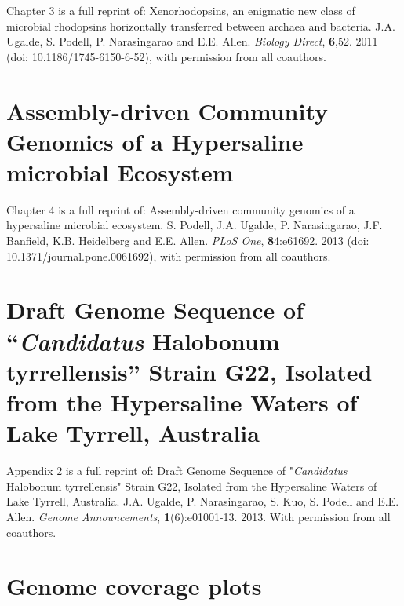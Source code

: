 \documentclass[12pt,chapterheads]{ucsd}
\begin{document}
Chapter 3 is a full reprint of: Xenorhodopsins, an enigmatic new class of microbial rhodopsins horizontally transferred between archaea and bacteria. J.A. Ugalde, S. Podell, P. Narasingarao and E.E. Allen. \textit{Biology Direct}, \textbf{6},52. 2011 (doi: 10.1186/1745-6150-6-52), with permission from all coauthors.


\chapter{Assembly-driven Community Genomics of a Hypersaline microbial Ecosystem}

%
Chapter 4 is a full reprint of: Assembly-driven community genomics of a hypersaline microbial ecosystem. S. Podell, J.A. Ugalde, P. Narasingarao, J.F. Banfield, K.B. Heidelberg and E.E. Allen. \textit{PLoS One}, \textbf{8}4:e61692. 2013 (doi: 10.1371/journal.pone.0061692), with permission from all coauthors.



%





\appendix

\chapter{Draft Genome Sequence of “\textit{Candidatus} Halobonum tyrrellensis” Strain G22, Isolated from the Hypersaline Waters of Lake Tyrrell, Australia}\label{G22Genome}


Appendix \ref{G22Genome} is a full reprint of: Draft Genome Sequence of "\textit{Candidatus} Halobonum tyrrellensis" Strain G22, Isolated from the Hypersaline Waters of Lake Tyrrell, Australia. J.A. Ugalde, P. Narasingarao, S. Kuo, S. Podell and E.E. Allen. \textit{Genome Announcements}, \textbf{1}(6):e01001-13. 2013. With permission from all coauthors.

\chapter{Genome coverage plots}\label{AppendixCoverage}

\end{document}

